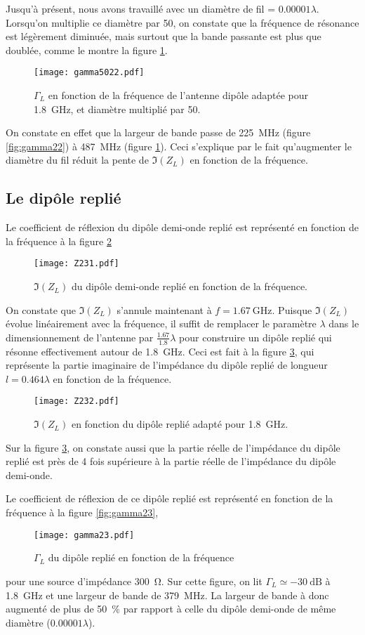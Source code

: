 Jusqu'à présent, nous avons travaillé avec un diamètre de fil = $0.00001 \lambda$. Lorsqu'on multiplie ce diamètre par 50, on constate que la fréquence de résonance est légèrement diminuée, mais surtout que la bande passante est plus que doublée, comme le montre la figure \ref{fig:gamma5022}.
\begin{figure}[htbp]
  \centering
  \texttt{[image: gamma5022.pdf]}
  \caption{$\Gamma_L$  en fonction de la fréquence de l'antenne dipôle adaptée pour \SI{1.8}{\giga\hertz}, et diamètre multiplié par 50.\label{fig:gamma5022}}
\end{figure}
On constate en effet que la largeur de bande passe de \SI{225}{\mega\hertz} (figure \ref{fig:gamma22}) à \SI{487}{\mega\hertz} (figure \ref{fig:gamma5022}). Ceci s'explique par le fait qu'augmenter le diamètre du fil réduit la pente de $\Im(Z_L)$ en fonction de la fréquence.

\subsection{Le dipôle replié}
Le coefficient de réflexion du dipôle demi-onde replié est représenté en fonction de la fréquence à la figure \ref{fig:Z231}
\begin{figure}[htbp]
  \centering
  \texttt{[image: Z231.pdf]}
  \caption{$\Im(Z_L)$ du dipôle demi-onde replié en fonction de la fréquence.\label{fig:Z231}}
\end{figure}
On constate que $\Im(Z_L)$ s'annule maintenant à $f = \SI{1.67}{\giga\hertz}$. Puisque $\Im(Z_L)$ évolue linéairement avec la fréquence, il suffit de remplacer le paramètre $\lambda$ dans le dimensionnement de l'antenne par $\frac{1.67}{1.8}\lambda$ pour construire un dipôle replié qui résonne effectivement autour de \SI{1.8}{\giga\hertz}. Ceci est fait à la figure \ref{fig:Z232}, qui représente la partie imaginaire de l'impédance du dipôle replié de longueur $l = 0.464 \lambda$ en fonction de la fréquence.
\begin{figure}[htbp]
  \centering
  \texttt{[image: Z232.pdf]}
  \caption{$\Im(Z_L)$ en fonction du dipôle replié adapté pour \SI{1.8}{\giga\hertz}.\label{fig:Z232}}
\end{figure}
Sur la figure \ref{fig:Z232}, on constate aussi que la partie réelle de l'impédance du dipôle replié est près de 4 fois supérieure à la partie réelle de l'impédance du dipôle demi-onde.

Le coefficient de réflexion de ce dipôle replié est représenté en fonction de la fréquence à la figure \ref{fig:gamma23},
\begin{figure}[htbp]
  \centering
  \texttt{[image: gamma23.pdf]}
  \caption{$\Gamma_L$ du dipôle replié en fonction de la fréquence}
\end{figure}
pour une source d'impédance \SI{300}{\ohm}. Sur cette figure, on lit $\Gamma_L \simeq \SI{-30}{\deci\bel}$ à \SI{1.8}{\giga\hertz} et une largeur de bande de \SI{379}{\mega\hertz}. La largeur de bande à donc augmenté de plus de \SI{50}{\percent} par rapport à celle du dipôle demi-onde de même diamètre ($0.00001\lambda$).

